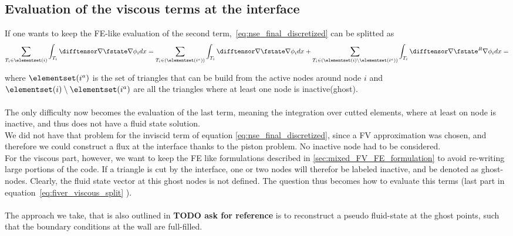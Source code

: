 \documentclass[../main.tex]{subfiles}
\begin{document}
\subsection{Evaluation of the viscous terms at the interface}\label{sec:fiver_viscous_term}

If one wants to keep the \ac{FE}-like evaluation of the second term,~\eqref{eq:nse_final_discretized} can be splitted as
\begin{align}\label{eq:fiver_viscous_split}
\sum_{T_i \in \elementset(i)} \int_{T_i} \difftensor \nabla \fstate \nabla \phi_i dx=
\sum_{T_i \in \left(\elementset(i^a)\right)} \int_{T_i} \difftensor \nabla \fstate \nabla \phi_i dx+
\sum_{T_i \in \left(\elementset(i)\setminus\elementset(i^a)\right)} \int_{T_i} \difftensor \nabla \fstate^R \nabla \phi_i dx=
\end{align}

where $\elementset(i^a)$ is the set of triangles that can be build from the active nodes around node $i$ and $\elementset(i)\setminus\elementset(i^a)$ are all the triangles where at least one node is inactive(ghost).\\
\\
The only difficulty now becomes the evaluation of the last term, meaning the integration over cutted elements, where at least on node is inactive, and thus does not have a fluid state solution.\\
We did not have that problem for the inviscid term of equation \eqref{eq:nse_final_discretized}, since a \ac{FV} approximation was chosen, and therefore we could construct a flux at the interface thanks to the piston problem. No inactive node had to be considered.\\
For the viscous part, however, we want to keep the \ac{FE} like formulations described in \ref{sec:mixed_FV_FE_formulation} to avoid re-writing large portions of the code. If a triangle is cut by the interface, one or two nodes will therefor be labeled inactive, and be denoted as ghost-nodes.
Clearly, the fluid state vector at this ghost nodes is not defined. The question thus becomes how to evaluate this terms (last part in equation~\eqref{eq:fiver_viscous_split} ).\\
\\
The approach we take, that is also outlined in \textbf{TODO ask for reference} is to reconstruct a pseudo fluid-state at the ghost points, such that the boundary conditions at the wall are full-filled.
\end{document}
